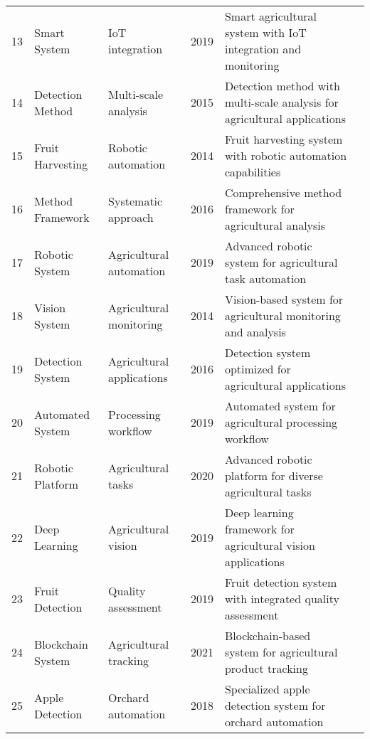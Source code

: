\begin{table*}[htbp]
\begin{tabular}{p{}p{}p{}p{}p{}p{}}
 13 & Smart System & IoT integration & 2019 & Smart agricultural system with IoT integration and monitoring & \cite{xiang2019fruit} \\
 14 & Detection Method & Multi-scale analysis & 2015 & Detection method with multi-scale analysis for agricultural applications & \cite{horng2019smart} \\
 15 & Fruit Harvesting & Robotic automation & 2014 & Fruit harvesting system with robotic automation capabilities & \cite{lu2015detecting} \\
 16 & Method Framework & Systematic approach & 2016 & Comprehensive method framework for agricultural analysis & \cite{hemming2014fruit} \\
 17 & Robotic System & Agricultural automation & 2019 & Advanced robotic system for agricultural task automation & \cite{liu2016method} \\
 18 & Vision System & Agricultural monitoring & 2014 & Vision-based system for agricultural monitoring and analysis & \cite{williams2019robotic} \\
 19 & Detection System & Agricultural applications & 2016 & Detection system optimized for agricultural applications & \cite{mehta2014vision} \\
 20 & Automated System & Processing workflow & 2019 & Automated system for agricultural processing workflow & \cite{nguyen2016detection} \\
 21 & Robotic Platform & Agricultural tasks & 2020 & Advanced robotic platform for diverse agricultural tasks & \cite{onishi2019automated} \\
 22 & Deep Learning & Agricultural vision & 2019 & Deep learning framework for agricultural vision applications & \cite{sepulveda2020robotic} \\
 23 & Fruit Detection & Quality assessment & 2019 & Fruit detection system with integrated quality assessment & \cite{pereira2019deep} \\
 24 & Blockchain System & Agricultural tracking & 2021 & Blockchain-based system for agricultural product tracking & \cite{kang2019fruit} \\
 25 & Apple Detection & Orchard automation & 2018 & Specialized apple detection system for orchard automation & \cite{pranto2021blockchain} \\
\bottomrule
\end{tabular}
\end{table*}

